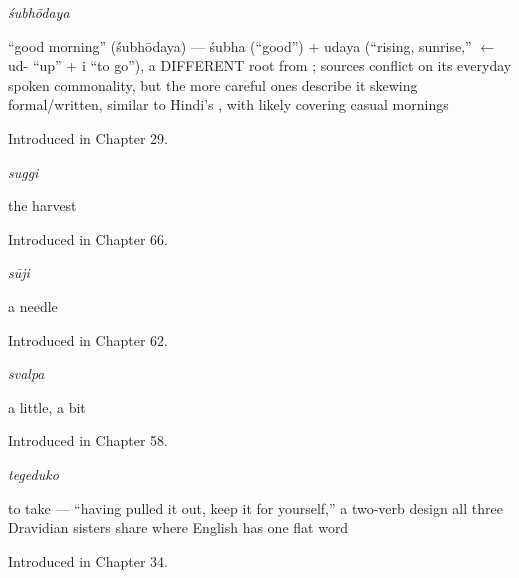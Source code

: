 \noindent\begin{minipage}[t]{\linewidth}
\raggedright
\textbf{}\enspace\emph{śubhōdaya}\par
\small \textquotedblleft{}good morning\textquotedblright{} (śubhōdaya) — śubha (\textquotedblleft{}good\textquotedblright{}) + udaya (\textquotedblleft{}rising, sunrise,\textquotedblright{} $\leftarrow$ ud- \textquotedblleft{}up\textquotedblright{} + i \textquotedblleft{}to go\textquotedblright{}), a DIFFERENT root from ; sources conflict on its everyday spoken commonality, but the more careful ones describe it skewing formal/written, similar to Hindi's , with  likely covering casual mornings\par
\footnotesize Introduced in Chapter 29.
\end{minipage}\par\medskip

\noindent\begin{minipage}[t]{\linewidth}
\raggedright
\textbf{}\enspace\emph{suggi}\par
\small the harvest\par
\footnotesize Introduced in Chapter 66.
\end{minipage}\par\medskip

\noindent\begin{minipage}[t]{\linewidth}
\raggedright
\textbf{}\enspace\emph{sūji}\par
\small a needle\par
\footnotesize Introduced in Chapter 62.
\end{minipage}\par\medskip

\noindent\begin{minipage}[t]{\linewidth}
\raggedright
\textbf{}\enspace\emph{svalpa}\par
\small a little, a bit\par
\footnotesize Introduced in Chapter 58.
\end{minipage}\par\medskip

\noindent\begin{minipage}[t]{\linewidth}
\raggedright
\textbf{}\enspace\emph{tegeduko}\par
\small to take — \textquotedblleft{}having pulled it out, keep it for yourself,\textquotedblright{} a two-verb design all three Dravidian sisters share where English has one flat word\par
\footnotesize Introduced in Chapter 34.
\end{minipage}\par\medskip

